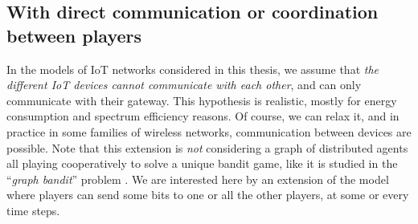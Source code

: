 




\subsection{With direct communication or coordination between players}
\label{sub:5:withCommunicationOrCoordination}

In the models of IoT networks considered in this thesis, we assume that \emph{the different IoT devices cannot communicate with each other}, and can only communicate with their gateway.
This hypothesis is realistic, mostly for energy consumption and spectrum efficiency reasons.
Of course, we can relax it, and in practice in some families of wireless networks, communication between devices are possible.
Note that this extension is \emph{not} considering a graph of distributed agents all playing cooperatively to solve a unique bandit game, like it is studied in the ``\emph{graph bandit}'' problem \cite{valko2016bandits}.
We are interested here by an extension of the model where players can send some bits to one or all the other players, at some or every time steps.

